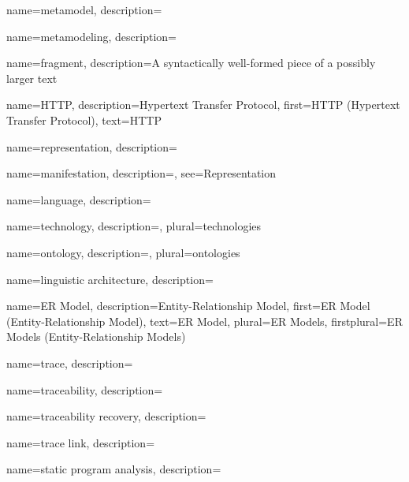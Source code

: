 {
    name={metamodel},
    description={}
}

{
    name={metamodeling},
    description={}
}

{
    name={fragment},
    description={A syntactically well-formed piece of a possibly larger text}
}

{
    name=HTTP,
    description={Hypertext Transfer Protocol},
    first={HTTP (Hypertext Transfer Protocol)},
    text={HTTP}
}

{
    name={representation},
    description={}
}

{
    name={manifestation},
    description={},
    see={Representation}   
}

{
    name={language},
    description={}
}

{
    name={technology},
    description={},
    plural={technologies}
}

{
    name={ontology},
    description={},
    plural={ontologies}
}


{
    name={linguistic architecture},
    description={}
}

{
    name={ER Model},
    description={Entity-Relationship Model},
    first={ER Model (Entity-Relationship Model)},
    text={ER Model},
    plural={ER Models},
    firstplural={ER Models (Entity-Relationship Models)}
}

{
    name={trace},
    description={}
}

{
    name={traceability},
    description={}
}

{
    name={traceability recovery},
    description={}
}

{
    name={trace link},
    description={}
}

{
    name={static program analysis},
    description={}
}